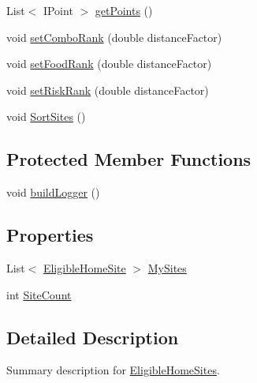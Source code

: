 \begin{DoxyCompactItemize}
List$<$ I\-Point $>$ \hyperlink{class_p_a_z___dispersal_1_1_eligible_home_sites_afd0e915357595ad1f26690cea4c6edb6}{get\-Points} ()
\item 
void \hyperlink{class_p_a_z___dispersal_1_1_eligible_home_sites_a9b02da90e018cd75965324cc1f64b9f0}{set\-Combo\-Rank} (double distance\-Factor)
\item 
void \hyperlink{class_p_a_z___dispersal_1_1_eligible_home_sites_afaa2aa7dc1dde55eb01c645effdcaf9c}{set\-Food\-Rank} (double distance\-Factor)
\item 
void \hyperlink{class_p_a_z___dispersal_1_1_eligible_home_sites_a53e2b39ed4cdbb45c672611c66e2090d}{set\-Risk\-Rank} (double distance\-Factor)
\item 
void \hyperlink{class_p_a_z___dispersal_1_1_eligible_home_sites_a099f79434540bb6e79b7f01e7d340a72}{Sort\-Sites} ()
\end{DoxyCompactItemize}
\subsection*{Protected Member Functions}
\begin{DoxyCompactItemize}
\item 
void \hyperlink{class_p_a_z___dispersal_1_1_eligible_home_sites_af977908ee6ce745c1fc7aff4b3ada571}{build\-Logger} ()
\end{DoxyCompactItemize}
\subsection*{Properties}
\begin{DoxyCompactItemize}
\item 
List$<$ \hyperlink{class_p_a_z___dispersal_1_1_eligible_home_site}{Eligible\-Home\-Site} $>$ \hyperlink{class_p_a_z___dispersal_1_1_eligible_home_sites_ac6f08db713ff9674d7649f93849b947e}{My\-Sites}
\item 
int \hyperlink{class_p_a_z___dispersal_1_1_eligible_home_sites_ac5c6d0fad97a12eae158b82988c786bc}{Site\-Count}
\end{DoxyCompactItemize}


\subsection{Detailed Description}
Summary description for \hyperlink{class_p_a_z___dispersal_1_1_eligible_home_sites}{Eligible\-Home\-Sites}. 



